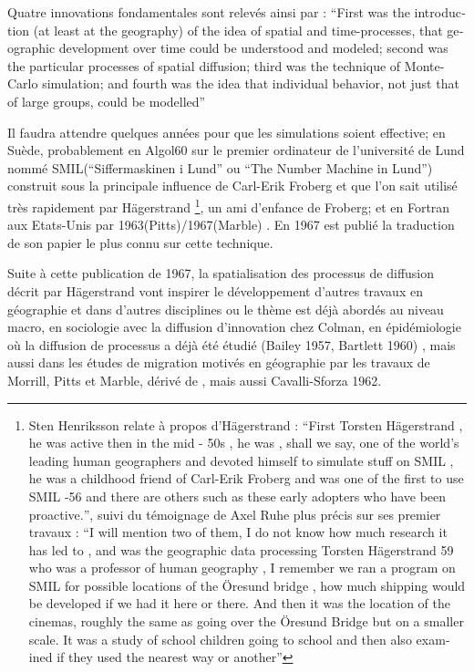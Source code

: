 {Quatre innovations fondamentales sont relevés ainsi par \textcite{Morril2005} : \foreignquote{english}{First was the introduction (at least at the geography) of the idea of spatial and time-processes, that geographic development over time could be understood and modeled; second was the particular processes of spatial diffusion; third was the technique of Monte-Carlo simulation; and fourth was the idea that individual behavior, not just that of large groups, could be modelled} 

Il faudra attendre quelques années pour que les simulations soient effective; en Suède, probablement en Algol60 sur le premier ordinateur de l'université de Lund nommé SMIL(\foreignquote{sweden}{Siffermaskinen i Lund} ou \foreignquote{english}{The Number Machine in Lund}) construit sous la principale influence de Carl-Erik Froberg et que l'on sait utilisé très rapidement par Hägerstrand \footnote{\autocite[32-33]{Lindgren2008} Sten Henriksson relate à propos d'Hägerstrand : \foreignquote{english}{First Torsten Hägerstrand , he was active then in the mid - 50s , he was , shall we say, one of the world's leading human geographers and devoted himself to simulate stuff on SMIL , he was a childhood friend of Carl-Erik Froberg and was one of the first to use SMIL -56 and there are others such as these early adopters who have been proactive.}, suivi du témoignage de Axel Ruhe plus précis sur ses premier travaux : \foreignquote{english}{I will mention two of them, I do not know how much research it has led to , and was the geographic data processing Torsten Hägerstrand 59 who was a professor of human geography , I remember we ran a program on SMIL for possible locations of the Öresund bridge , how much shipping would be developed if we had it here or there. And then it was the location of the cinemas, roughly the same as going over the Öresund Bridge but on a smaller scale. It was a study of school children going to school and then also examined if they used the nearest way or another}}, un ami d'enfance de Froberg; et en Fortran aux Etats-Unis par 1963(Pitts)/1967(Marble) \autocite{Morril2005, Marble1972, Pitts1963}. En 1967 \autocite{Hagerstrand1967a} est publié la traduction de son papier le plus connu sur cette technique. 

Suite à cette publication de 1967, la spatialisation des processus de diffusion décrit par Hägerstrand vont inspirer le développement d'autres travaux en géographie et dans d'autres disciplines ou le thème est déjà abordés au niveau macro, en sociologie avec la diffusion d'innovation chez Colman, en épidémiologie \autocite{Cliff1981, Cliff2000} où la diffusion de processus a déjà été étudié (Bailey 1957, Bartlett 1960) \textcite{Pitts1963, Morrill1968}, mais aussi dans les études de migration motivés en géographie par les travaux de Morrill, Pitts et Marble, dérivé de \autocite{Wolpert1965}, mais aussi Cavalli-Sforza 1962. 

}
